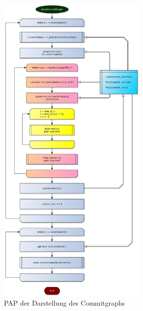 \documentclass[color, ddc]{tudscrreprt}
\begin{document}
\begin{figure}[hb!]
\centering
\includegraphics[width=0.65\textwidth]{Skizzen/PAP_gesamt.jpg}
\caption{PAP der Darstellung des Commitgraphs}
\label{pap-img}
\end{figure}




\end{document}
